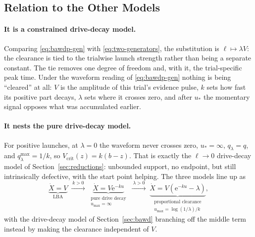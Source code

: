 \documentclass[12pt]{article}
\newcommand{\e}{\mathrm{e}}
\theoremstyle{remark}
\begin{document}
\subsection{Relation to the Other Models}
\paragraph{It is a constrained drive-decay model.} Comparing
\eqref{eq:bawdp-gen} with \eqref{eq:two-generators}, the substitution is
$\ell \mapsto \lambda V$: the clearance is tied to the trialwise launch strength rather than being a separate constant. The tie removes one degree of freedom and, with it, the trial-specific peak time. Under the waveform reading of \eqref{eq:bawdp-gen} nothing is being ``cleared'' at all: $V$ is the amplitude of this trial's evidence pulse, $k$ sets how fast its positive part decays, $\lambda$ sets where it crosses zero, and after $u_{*}$ the momentary signal opposes what was accumulated earlier.

\paragraph{It nests the pure drive-decay model.} For positive launches, at
$\lambda=0$ the waveform never crosses zero, $u_{*}=\infty$, $q_{\lambda}=q$, and $q_{\lambda}^{\max}=1/k$, so $V_{\mathrm{crit}}(z)=k(b-z)$. That is exactly the $\ell\to0$ drive-decay model of Section~\ref{sec:reductions}: unbounded support, no endpoint, but still intrinsically defective, with the start point helping. The three models line up as
\begin{equation}
  \underbrace{\dot X = V}_{\text{LBA}}
  \;\xrightarrow{\ k>0\ }\;
  \underbrace{\dot X = V\e^{-ku}}_{\substack{\text{pure drive decay}\\ u_{\max} = \infty}}
  \;\xrightarrow{\ \lambda>0\ }\;
  \underbrace{\dot X = V(\e^{-ku} - \lambda)}_{\substack{\text{proportional clearance}\\ u_{\max} = \log(1/\lambda)/k}},
\end{equation}
with the drive-decay model of Section~\ref{sec:bawd} branching off the middle term instead by making the clearance independent of $V$.
\end{document}
